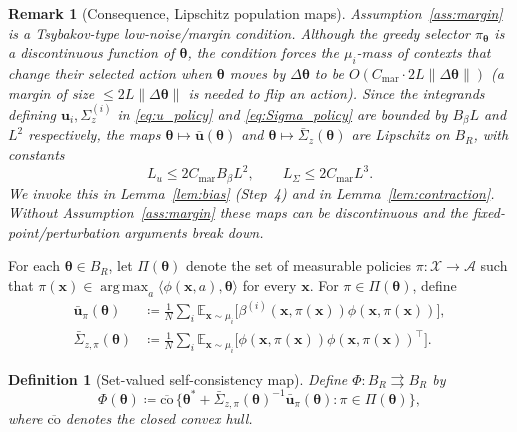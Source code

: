 \documentclass[11pt]{article}
\newtheorem{definition}[theorem]{Definition}
\newtheorem*{remark}{Remark}
\DeclareMathOperator*{\argmax}{arg\,max}
\begin{document}
\begin{remark}[Consequence, Lipschitz population maps]\label{rem:lip}
Assumption~\ref{ass:margin} is a Tsybakov-type low-noise/margin
condition.  Although the greedy selector $\pi_{\bm{\theta}}$ is a
\emph{discontinuous} function of $\bm{\theta}$, the condition forces
the $\mu_i$-mass of contexts that \emph{change} their selected action
when $\bm{\theta}$ moves by $\Delta\bm{\theta}$ to be
$O(C_{\mathrm{mar}}\cdot 2L\|\Delta\bm{\theta}\|)$ (a margin of size
$\leq 2L\|\Delta\bm{\theta}\|$ is needed to flip an action).  Since
the integrands defining $\bm{u}_i,\Sigma_z^{(i)}$ in
\eqref{eq:u_policy} and \eqref{eq:Sigma_policy} are bounded by $B_\beta L$
and $L^2$ respectively, the maps
$\bm{\theta}\mapsto\bar{\bm{u}}(\bm{\theta})$ and
$\bm{\theta}\mapsto\bar{\Sigma}_z(\bm{\theta})$ are Lipschitz on $B_R$,
with constants
\[
L_u\leq 2C_{\mathrm{mar}}B_\beta L^2,\qquad
L_\Sigma\leq 2C_{\mathrm{mar}}L^3.
\]
We invoke this in Lemma~\ref{lem:bias} (Step~4) and in
Lemma~\ref{lem:contraction}.  Without
Assumption~\ref{ass:margin} these maps can be discontinuous and the
fixed-point/perturbation arguments break down.
\end{remark}

For each $\bm{\theta}\in B_R$, let $\Pi(\bm{\theta})$ denote the set of
measurable policies $\pi:\mathcal{X}\to\mathcal{A}$ such that
$\pi(\bm{x})\in\argmax_a\langle\phi(\bm{x},a),\bm{\theta}\rangle$
for every $\bm{x}$.  For $\pi\in\Pi(\bm{\theta})$, define
\begin{align*}
\bar{\bm{u}}_\pi(\bm{\theta})&\coloneqq
\tfrac{1}{N}\sum_i\mathbb{E}_{\bm{x}\sim\mu_i}
\bigl[\beta^{(i)}(\bm{x},\pi(\bm{x}))\phi(\bm{x},\pi(\bm{x}))\bigr],\\
\bar{\Sigma}_{z,\pi}(\bm{\theta})&\coloneqq
\tfrac{1}{N}\sum_i\mathbb{E}_{\bm{x}\sim\mu_i}
\bigl[\phi(\bm{x},\pi(\bm{x}))\phi(\bm{x},\pi(\bm{x}))^\top\bigr].
\end{align*}

\begin{definition}[Set-valued self-consistency map]\label{def:Phi}
Define $\Phi:B_R\rightrightarrows B_R$ by
\[
\Phi(\bm{\theta})\coloneqq
\overline{\mathrm{co}}\,\bigl\{
\bm{\theta}^{\!*}+\bar{\Sigma}_{z,\pi}(\bm{\theta})^{-1}
\bar{\bm{u}}_\pi(\bm{\theta}):\pi\in\Pi(\bm{\theta})\bigr\},
\]
where $\overline{\mathrm{co}}$ denotes the closed convex hull.
\end{definition}
\end{document}
